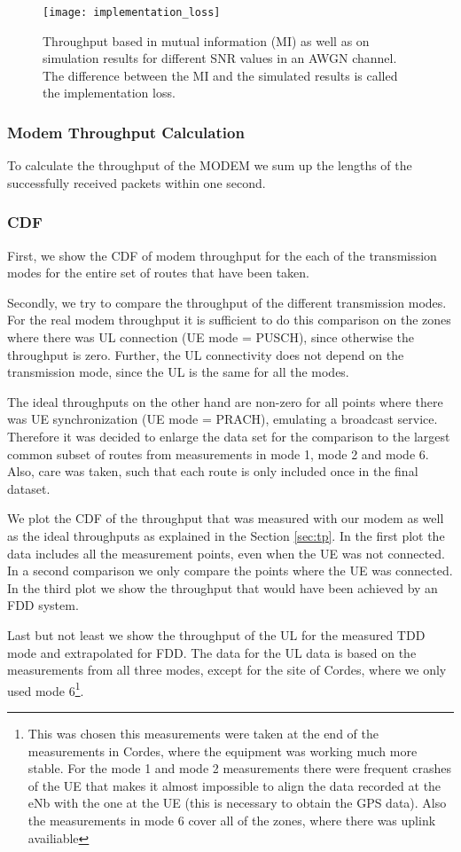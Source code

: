 \documentclass[a4paper,10pt]{article}
\begin{document}
\begin{figure}
 \centering
 \texttt{[image: implementation\_loss]}
 \caption{Throughput based in mutual information (MI) as well as on simulation results for different SNR values in an AWGN channel. The difference between the MI and the simulated results is called the implementation loss.}
 \label{fig:imp_loss}
\end{figure} 

\subsubsection{Modem Throughput Calculation}
To calculate the throughput of the MODEM we sum up the lengths of the successfully received packets within one second. 


\subsubsection{CDF}
\label{sec:cdf}

First, we show the CDF of modem throughput for the each of the transmission modes for the entire set of routes that have been taken.

Secondly, we try to compare the throughput of the different transmission modes. For the real modem throughput it is sufficient to do this comparison on the zones where there was UL connection (UE mode = PUSCH), since otherwise the throughput is zero. Further, the UL connectivity does not depend on the transmission mode, since the UL is the same for all the modes. 

The ideal throughputs on the other hand are non-zero for all points where there was UE synchronization (UE mode = PRACH), emulating a broadcast service. Therefore it was decided to enlarge the data set for the comparison to the largest common subset of routes from measurements in mode 1, mode 2 and mode 6. Also, care was taken, such that each route is only included once in the final dataset.

We plot the CDF of the throughput that was measured with our modem as well as the ideal throughputs as explained in the Section \ref{sec:tp}. In the first plot the data includes all the measurement points, even when the UE was not connected. In a second comparison we only compare the points where the UE was connected. In the third plot we show the throughput that would have been achieved by an FDD system.

Last but not least we show the throughput of the UL for the measured TDD mode and extrapolated for FDD. The data for the UL data is based on the measurements from all three modes, except for the site of Cordes, where we only used mode 6\footnote{This was chosen this measurements were taken at the end of the measurements in Cordes, where the equipment was working much more stable. For the mode 1 and mode 2 measurements there were frequent crashes of the UE that makes it almost impossible to align the data recorded at the eNb with the one at the UE (this is necessary to obtain the GPS data). Also the measurements in mode 6 cover all of the zones, where there was uplink availiable}.
\end{document}
